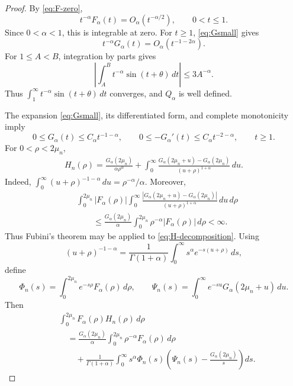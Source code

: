 \documentclass[10pt,a4paper]{amsart}
\begin{document}
\begin{proof}
By \eqref{eq:F-zero},
\[
 t^{-\alpha}F_\alpha(t)=O_\alpha(t^{-\alpha/2}),
 \qquad 0<t\le1.
\]
Since $0<\alpha<1$, this is integrable at zero.  For $t\ge1$,
\eqref{eq:Gsmall} gives
\[
 t^{-\alpha}G_\alpha(t)=O_\alpha(t^{-1-2\alpha}).
\]
For $1\le A<B$, integration by parts gives
\[
 \left|\int_A^B t^{-\alpha}\sin(t+\theta)\,dt\right|
 \le3A^{-\alpha}.
\]
Thus $\int_1^\infty t^{-\alpha}\sin(t+\theta)\,dt$ converges, and
$Q_\alpha$ is well defined.

The expansion \eqref{eq:Gsmall}, its differentiated form, and complete
monotonicity imply
\begin{equation}\label{eq:G-tail-bounds-small}
 0\le G_\alpha(t)\le C_\alpha t^{-1-\alpha},
 \qquad
 0\le-G_\alpha'(t)\le C_\alpha t^{-2-\alpha},
 \qquad t\ge1.
\end{equation}
For $0<\rho<2\mu_n$,
\begin{equation}\label{eq:H-decomposition}
 \begin{aligned}
 H_n(\rho)
 =\frac{G_\alpha(2\mu_n)}{\alpha\rho^\alpha}+\int_0^\infty
 \frac{G_\alpha(2\mu_n+u)-G_\alpha(2\mu_n)}
 {(u+\rho)^{1+\alpha}}\,du.
 \end{aligned}
\end{equation}
Indeed,
$\int_0^\infty(u+\rho)^{-1-\alpha}\,du=\rho^{-\alpha}/\alpha$.
Moreover,
\[
 \begin{aligned}
 &\int_0^{2\mu_n}|F_\alpha(\rho)|\int_0^\infty
 \frac{|G_\alpha(2\mu_n+u)-G_\alpha(2\mu_n)|}
 {(u+\rho)^{1+\alpha}}\,du\,d\rho\\
 &\qquad\le\frac{G_\alpha(2\mu_n)}\alpha
 \int_0^{2\mu_n}\rho^{-\alpha}|F_\alpha(\rho)|\,d\rho<\infty.
 \end{aligned}
\]
Thus Fubini's theorem may be applied to \eqref{eq:H-decomposition}.  Using
\[
 (u+\rho)^{-1-\alpha}
 =\frac1{\Gamma(1+\alpha)}
 \int_0^\infty s^\alpha e^{-s(u+\rho)}\,ds,
\]
define
\[
 \Phi_n(s)=\int_0^{2\mu_n}e^{-s\rho}F_\alpha(\rho)\,d\rho,
 \qquad
 \Psi_n(s)=\int_0^\infty e^{-su}G_\alpha(2\mu_n+u)\,du.
\]
Then
\begin{equation}\label{eq:FH-Laplace-decomposition}
 \begin{aligned}
 &\int_0^{2\mu_n}F_\alpha(\rho)H_n(\rho)\,d\rho\\
 &\quad=\frac{G_\alpha(2\mu_n)}\alpha
 \int_0^{2\mu_n}\rho^{-\alpha}F_\alpha(\rho)\,d\rho\\
 &\qquad+\frac1{\Gamma(1+\alpha)}\int_0^\infty
 s^\alpha\Phi_n(s)
 \left(\Psi_n(s)-\frac{G_\alpha(2\mu_n)}s\right)ds.
 \end{aligned}
\end{equation}


\end{proof}
\end{document}
